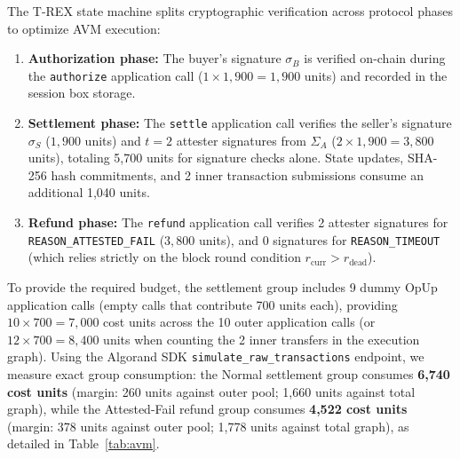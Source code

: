 The T-REX state machine splits cryptographic verification across protocol phases to optimize AVM execution:
\begin{enumerate}[leftmargin=*]
\item \textbf{Authorization phase:} The buyer's signature $\sigma_B$ is verified on-chain during the \texttt{authorize} application call ($1 \times 1{,}900 = 1{,}900$ units) and recorded in the session box storage.
\item \textbf{Settlement phase:} The \texttt{settle} application call verifies the seller's signature $\sigma_S$ ($1{,}900$ units) and $t = 2$ attester signatures from $\Sigma_A$ ($2 \times 1{,}900 = 3{,}800$ units), totaling 5{,}700 units for signature checks alone. State updates, SHA-256 hash commitments, and 2 inner transaction submissions consume an additional 1{,}040 units.
\item \textbf{Refund phase:} The \texttt{refund} application call verifies 2 attester signatures for \texttt{REASON\_ATTESTED\_FAIL} ($3{,}800$ units), and 0 signatures for \texttt{REASON\_TIMEOUT} (which relies strictly on the block round condition $r_{\text{curr}} > r_{\text{dead}}$).
\end{enumerate}

To provide the required budget, the settlement group includes 9 dummy OpUp application calls (empty calls that contribute 700 units each), providing $10 \times 700 = 7{,}000$ cost units across the 10 outer application calls (or $12 \times 700 = 8{,}400$ units when counting the 2 inner transfers in the execution graph). Using the Algorand SDK \texttt{simulate\_raw_transactions} endpoint, we measure exact group consumption: the Normal settlement group consumes \textbf{6{,}740 cost units} (margin: 260 units against outer pool; 1{,}660 units against total graph), while the Attested-Fail refund group consumes \textbf{4{,}522 cost units} (margin: 378 units against outer pool; 1{,}778 units against total graph), as detailed in Table~\ref{tab:avm}.


